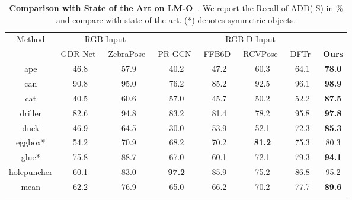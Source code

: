 \begin{table*}
  \centering
  \begin{tabular}{c|c|c|c|c|c|c|c}
    \toprule 
    \multirow{2}{*}{Method} & \multicolumn{2}{c|}{RGB Input} & \multicolumn{5}{c}{RGB-D Input} \\ 
         \cline{2-8}
      & GDR-Net~\cite{wang2021gdr} 
& ZebraPose~\cite{su2022zebrapose}&  PR-GCN~\cite{Zhou2021PRGCNAD} 
&  FFB6D~\cite{he2021ffb6d} 
& RCVPose~\cite{wu2022vote} 
& DFTr~\cite{zhou2023deep} &\textbf{Ours}\\
    \midrule
     ape & 46.8 
& 57.9& 40.2 
& 47.2 
&  60.3 
& 64.1 &  \textbf{78.0}\\
     can & 90.8 
& 95.0& 76.2 
& 85.2 
&  92.5 
& 96.1 &  \textbf{98.9}  \\
     cat & 40.5 
& 60.6& 57.0 
& 45.7 
&  50.2 
& 52.2 &  \textbf{87.5}\\
     driller & 82.6 
& 94.8& 83.2 
& 81.4 
&  78.2 
& 95.8 &  \textbf{97.8}\\
     duck & 46.9 
& 64.5& 30.0 
& 53.9 
&  52.1 
& 72.3 &  \textbf{85.3}\\
     eggbox* & 54.2 
& 70.9& 68.2 
& 70.2 
&  \textbf{81.2} 
& 75.3 &  80.3\\
     glue* & 75.8 
& 88.7& 67.0 
& 60.1 
&  72.1 
& 79.3 &  \textbf{94.1}\\
     holepuncher & 60.1 
& 83.0& \textbf{97.2} 
& 85.9 
& 75.2 
& 86.8 &  95.2  \\
     \hline
     mean & 62.2 & 76.9&  65.0 &  66.2 &  70.2 & 77.7 & \textbf{89.6}\\
    \bottomrule
  \end{tabular}
  \caption{\textbf{Comparison with State of the Art on LM-O~\cite{Brachmann2016UncertaintyDriven6P}}. We report the Recall of ADD(-S) in \% and compare with state of the art. (*) denotes symmetric objects.}
  \label{tab:lmo_results_table_}
\end{table*}

